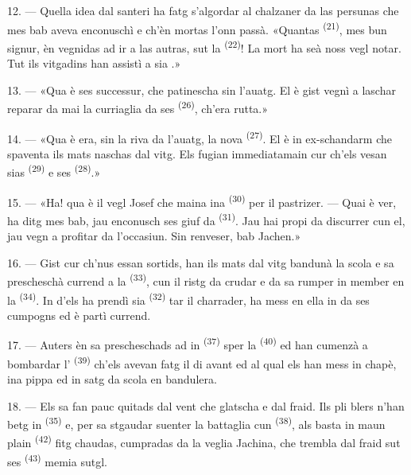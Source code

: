 12. --- Quella idea dal santeri ha fatg s'algordar al chalzaner da las persunas che
mes bab aveva enconuschì e ch'èn mortas l'onn passà. «Quantas 
\textsuperscript{(21)}, mes bun signur, èn vegnidas ad ir a las autras, sut la
 \textsuperscript{(22)}! La mort ha seà noss vegl notar. Tut ils
vitgadins han assistì a sia .»

13. --- «Qua è ses successur, che patinescha sin l'auatg. El è gist vegnì a laschar
reparar da mai la curriaglia da ses  \textsuperscript{(26)}, ch'era
rutta.»

14. --- «Qua è era, sin la riva da l'auatg, la nova 
\textsuperscript{(27)}. El è in ex-schandarm che spaventa ils mats naschas dal vitg.
Els fugian immediatamain cur ch'els vesan sias 
\textsuperscript{(29)} e ses  \textsuperscript{(28)}.»

15. --- «Ha! qua è il vegl Josef che maina ina 
\textsuperscript{(30)} per il pastrizer. --- Quai è ver, ha ditg mes bab, jau
enconusch ses giuf da  \textsuperscript{(31)}. Jau hai propi da discurrer
cun el, jau vegn a profitar da l'occasiun. Sin renveser, bab Jachen.»

16. --- Gist cur ch'nus essan sortids, han ils mats dal vitg bandunà la scola e sa
prescheschà currend a la  \textsuperscript{(33)}, cun il ristg da
crudar e da sa rumper in member en la  \textsuperscript{(34)}. In d'els
ha prendì sia  \textsuperscript{(32)} tar il charrader, ha mess en ella
in da ses cumpogns ed è partì currend.

17. --- Auters èn sa prescheschads ad in  \textsuperscript{(37)}
sper la  \textsuperscript{(40)} ed han cumenzà a bombardar l' \textsuperscript{(39)} ch'els avevan fatg il di avant ed al qual els han mess in
chapè, ina pippa ed in satg da scola en bandulera.

18. --- Els sa fan pauc quitads dal vent che glatscha e dal fraid. Ils pli blers
n'han betg in  \textsuperscript{(35)} e, per sa stgaudar suenter la
battaglia cun  \textsuperscript{(38)}, als basta in maun
plain  \textsuperscript{(42)} fitg chaudas, cumpradas da la veglia
 Jachina, che trembla dal fraid sut ses 
\textsuperscript{(43)} memia sutgl.

